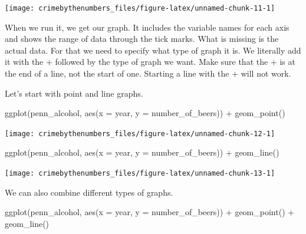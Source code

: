 \documentclass[
  12pt,
]{book}
\newenvironment{Shaded}{\begin{snugshade}}{\end{snugshade}}
\newcommand{\AttributeTok}[1]{\textcolor[rgb]{0.61,0.61,0.61}{#1}}
\newcommand{\FunctionTok}[1]{\textcolor[rgb]{0,0,0}{#1}}
\newcommand{\NormalTok}[1]{#1}
\newcommand{\SpecialCharTok}[1]{\textcolor[rgb]{0,0,0}{#1}}
\begin{document}
\begin{center}\texttt{[image: crimebythenumbers\_files/figure-latex/unnamed-chunk-11-1]} \end{center}

When we run it, we get our graph. It includes the variable names for each axis and shows the range of data through the tick marks. What is missing is the actual data. For that we need to specify what type of graph it is. We literally add it with the + followed by the type of graph we want. Make sure that the + is at the end of a line, not the start of one. Starting a line with the + will not work.

Let's start with point and line graphs.

\begin{Shaded}
\begin{Highlighting}[]
\FunctionTok{ggplot}\NormalTok{(penn\_alcohol, }\FunctionTok{aes}\NormalTok{(}\AttributeTok{x =}\NormalTok{ year, }\AttributeTok{y =}\NormalTok{ number\_of\_beers)) }\SpecialCharTok{+}
  \FunctionTok{geom\_point}\NormalTok{()}
\end{Highlighting}
\end{Shaded}

\begin{center}\texttt{[image: crimebythenumbers\_files/figure-latex/unnamed-chunk-12-1]} \end{center}

\begin{Shaded}
\begin{Highlighting}[]
\FunctionTok{ggplot}\NormalTok{(penn\_alcohol, }\FunctionTok{aes}\NormalTok{(}\AttributeTok{x =}\NormalTok{ year, }\AttributeTok{y =}\NormalTok{ number\_of\_beers)) }\SpecialCharTok{+}
  \FunctionTok{geom\_line}\NormalTok{()}
\end{Highlighting}
\end{Shaded}

\begin{center}\texttt{[image: crimebythenumbers\_files/figure-latex/unnamed-chunk-13-1]} \end{center}

We can also combine different types of graphs.

\begin{Shaded}
\begin{Highlighting}[]
\FunctionTok{ggplot}\NormalTok{(penn\_alcohol, }\FunctionTok{aes}\NormalTok{(}\AttributeTok{x =}\NormalTok{ year, }\AttributeTok{y =}\NormalTok{ number\_of\_beers)) }\SpecialCharTok{+}
  \FunctionTok{geom\_point}\NormalTok{() }\SpecialCharTok{+}
  \FunctionTok{geom\_line}\NormalTok{()}
\end{Highlighting}
\end{Shaded}
\end{document}
